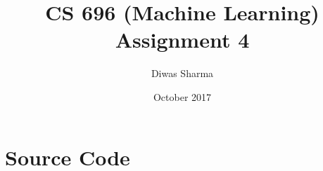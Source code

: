 \documentclass{article}
\title{CS 696 (Machine Learning) \\ \large Assignment 4}
\author{Diwas Sharma}
\date{October 2017}
\begin{document}
\maketitle






\section{Source Code}

\end{document}
